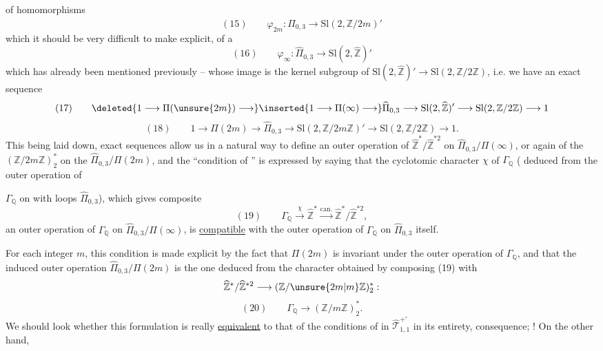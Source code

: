 of homomorphisms
\[
(15)\qquad \varphi_{2m}:\widehat\Pi_{0,3}\longrightarrow\mathrm{Sl}(2,\mathbb Z/2m)'
\]
which it should  be very difficult to make explicit,   of a 
\[
(16)\qquad \varphi_{\infty}:\widehat\Pi_{0,3}\longrightarrow\mathrm{Sl}(2,\widehat{\mathbb Z})'
\]
which has already been mentioned previously --  whose image is the kernel subgroup of $\mathrm{Sl}(2,\widehat{\mathbb Z})'\longrightarrow\mathrm{Sl}(2,\mathbb Z/2\mathbb Z)$, i.e. we have an exact sequence
\[
(17)\qquad \deleted{1\longrightarrow\Pi(\unsure{2m})\longrightarrow}\inserted{1\longrightarrow\Pi(\infty)\longrightarrow}\widehat\Pi_{0,3}\longrightarrow\mathrm{Sl}(2,\widehat{\mathbb Z})'\longrightarrow\mathrm{Sl}(2,\mathbb Z/2\mathbb Z)\longrightarrow1
\]
\[
(18)\qquad 1\longrightarrow\Pi(2m)\longrightarrow\widehat\Pi_{0,3}\longrightarrow\mathrm{Sl}(2,\mathbb Z/2m\mathbb Z)'\longrightarrow\mathrm{Sl}(2,\mathbb Z/2\mathbb Z)\longrightarrow1.
\]
This being laid down,  exact sequences allow us in a natural way to define an outer operation of $\widehat{\mathbb Z}^{*}/\widehat{\mathbb Z}^{*2}$ on $\widehat\Pi_{0,3}/\Pi(\infty)$, or again of the $(\mathbb Z/2m\mathbb Z)^*_2$ on the $\widehat\Pi_{0,3}/\Pi(2m)$, and the ``condition of '' is expressed by saying that the cyclotomic character $\chi$ of $\Gamma_{\mathbb Q}$ ( deduced from the outer operation of

$\Gamma_{\mathbb Q}$ on   with loops $\widehat\Pi_{0,3}$), which gives  composite
\[
(19)\qquad \Gamma_{\mathbb Q}\xrightarrow{\chi}\widehat{\mathbb Z}^{*}\xrightarrow{\mathrm{can.}}\widehat{\mathbb Z}^{*}/\widehat{\mathbb Z}^{*2},
\]
 an outer operation of $\Gamma_{\mathbb Q}$ on $\widehat\Pi_{0,3}/\Pi(\infty)$, is \uline{compatible} with the outer operation of $\Gamma_{\mathbb Q}$ on $\widehat\Pi_{0,3}$ itself.

For each integer $m$, this condition is made explicit by the fact that $\Pi(2m)$ is invariant under the outer operation of $\Gamma_{\mathbb Q}$, and that the induced outer operation  $\widehat\Pi_{0,3}/\Pi(2m)$ is the one deduced from the character obtained by composing (19) with
\[
\widehat{\mathbb Z}^{*}/\widehat{\mathbb Z}^{*2}\longrightarrow(\mathbb Z/\unsure{2m|m}\mathbb Z)^*_2:
\]
\[
(20)\qquad \Gamma_{\mathbb Q}\longrightarrow(\mathbb Z/m\mathbb Z)^*_2.
\]
We should look whether this formulation is really \uline{equivalent} to that of the conditions of  in $\widehat{\mathcal T}_{1,1}^{+\prime}$ in its  entirety,   consequence;  ! On the other hand, 
